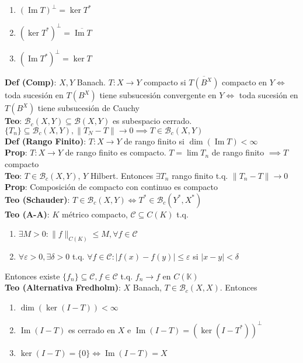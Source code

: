 \documentclass[9pt, letterpaper]{extarticle}
\newcommand{\K}{\mathbb{K}}
\begin{document}
\begin{multicols*}{2}
\begin{enumerate}
	\item $(\operatorname{Im}T)^\perp=\operatorname{ker} T^*$
	\item $(\operatorname{ker} T^*)^\perp= \overline{\operatorname{Im}T}$
	\item $(\operatorname{Im}T^*)^\perp=\operatorname{ker}T$
\end{enumerate}
\textbf{Def (Comp)}: $X,Y$ Banach. $T:X\to Y$ compacto si $\overline{T(B^X)}$ compacto en $Y\iff$ toda sucesión en $T(B^X)$ tiene subsucesión convergente en $Y\iff$ toda sucesión en $T(B^X)$ tiene subsucesión de Cauchy\\
\textbf{Teo}: $\mathcal{B}_c(X,Y)\subseteq \mathcal{B}(X,Y)$ es subespacio cerrado. $\{T_n\}\subseteq \mathcal{B}_c(X,Y), \|T_N-T\|\to 0\implies T\in\mathcal{B}_c(X,Y)$\\
\textbf{Def (Rango Finito)}: $T:X\to Y$ de rango finito si $\operatorname{dim}(\operatorname{Im} T)<\infty$\\
\textbf{Prop}: $T:X\to Y$ de rango finito es compacto. $T=\lim T_n$ de rango finito $\implies T$ compacto\\
\textbf{Teo}: $T\in\mathcal{B}_c(X,Y)$, $Y$ Hilbert. Entonces $\exists T_n$ rango finito t.q. $\|T_n-T\|\to 0$\\
\textbf{Prop}: Composición de compacto con continuo es compacto\\
\textbf{Teo (Schauder)}: $T\in\mathcal{B}_c(X,Y)\iff T^*\in\mathcal{B}_c(Y^*,X^*)$\\
\textbf{Teo (A-A)}: $K$ métrico compacto, $\mathcal{C}\subseteq C(K)$ t.q.\begin{enumerate}
	\item $\exists M>0:\|f\|_{C(K)}\leq M,\forall f\in \mathcal{C}$
	\item $\forall\varepsilon>0,\exists\delta>0$ t.q. $\forall f\in\mathcal{C}:|f(x)-f(y)|\leq \varepsilon$ si $|x-y|<\delta$
\end{enumerate} Entonces existe $\{f_n\}\subseteq \mathcal{C},f\in\mathcal{C}$ t.q. $f_n\to f$ en $C(\K)$\\
\textbf{\color{red}Teo (Alternativa Fredholm)}: $X$ Banach, $T\in\mathcal{B}_c(X,X)$. Entonces\begin{enumerate}
	\item $\operatorname{dim}(\operatorname{ker}(I-T))<\infty$
	\item $\operatorname{Im}(I-T)$ es cerrado en $X$ e $\operatorname{Im}(I-T)=(\operatorname{ker}(I-T^*))^\perp$
	\item $\operatorname{ker}(I-T)=\{0\}\iff \operatorname{Im}(I-T)=X$

\end{enumerate}
\end{multicols*}
\end{document}
